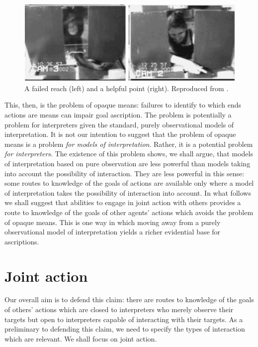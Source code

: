 \documentclass[14pt,a4paper]{extarticle}
\begin{document}
\begin{figure}
\begin{center}
\includegraphics[width=12cm]{figure_hare_toma_2004_e3.png}
\caption{
\label{fig:reach_point}
	A failed reach (left) and a helpful point (right).
	Reproduced from \citet[p.\ 557, figure 4]{hare_chimpanzees_2004}.
}
\end{center}
\end{figure}

This, then, is the problem of opaque means:
failures to identify to which ends actions are means can impair goal ascription.
The problem is potentially a problem for interpreters given the standard, purely observational models of interpretation.
It is not our intention to suggest that the problem of opaque means is a problem \emph{for models of interpretation}.
Rather, it is a potential problem \emph{for interpreters}.
The existence of this problem shows, we shall argue, that models of interpretation based on pure observation are less powerful than models taking into account the possibility of interaction.
They are less powerful in this sense: 
some routes to knowledge of the goals of actions are available only where a model of interpretation takes the possibility of interaction into account.
In what follows we shall suggest that abilities to engage in joint action with others provides a route to knowledge of the goals of other agents' actions  which avoids the problem of opaque means.
This is one way in which moving away from a purely observational model of interpretation yields a richer evidential base for ascriptions.


\section{Joint action}
\label{sec:joint_action}
Our overall aim is to defend this claim:
there are routes to knowledge of the goals of others' actions
which are closed to
interpreters who merely observe their targets
but open to 
interpreters capable of interacting with their targets.
As a preliminary to defending this claim,
we need to specify the types of interaction which are relevant.
We shall focus on joint action.
\end{document}
